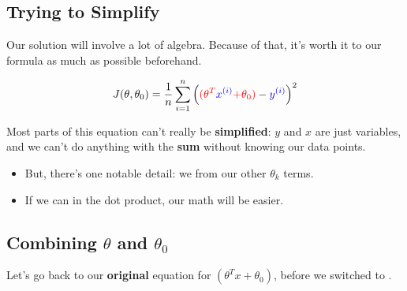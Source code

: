     \phantom{}
    
    \subsection{Trying to Simplify}
        
        Our solution will involve a lot of algebra. Because of that, it's worth it to  our formula as much as possible beforehand.
        
        \begin{equation}
            J(\theta,\theta_0) = 
                        \frac{1}{n}  \sum_{i=1}^n 
                        \left( 
                                \textcolor{red}{ (\theta^T} \textcolor{blue}{x^{(i)}} \textcolor{red}{ + \theta_0) 
                            }
                            - 
                                \textcolor{blue}{y^{(i)}}
                        \right)^2 
        \end{equation}
        
        Most parts of this equation can't really be \textbf{simplified}: $y$ and $x$ are just variables, and we can't do anything with the \textbf{sum} without knowing our data points.

        \begin{itemize}
            \item But, there's one notable detail: we  from our other $\theta_k$ terms. 
            \item If we can  in the dot product, our math will be easier.
        \end{itemize}
        

    \phantom{}
        
    \subsection{Combining $\theta$ and $\theta_0$}
        
         Let's go back to our \textbf{original} equation for $ (\theta^T x  + \theta_0)  $, before we switched to .
        
